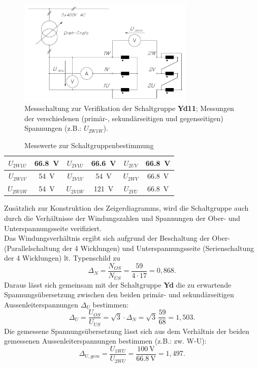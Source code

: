 \begin{figure}[h!]
    \centering
    \includegraphics[width=0.75\textwidth, angle =0]{3/images/Schaltgruppe_Messungen.pdf}
    \caption{Messschaltung zur Verifikation der Schaltgruppe \textbf{Yd11}; Messungen der verschiedenen (primär-, sekundärseitigen und gegenseitigen) Spannungen (z.B.: $U_{2W1W}$).}
    \label{fig:Schaltgruppe_Messschaltung}
\end{figure}
\begin{table}[h!]
    \centering
    \begin{tabular}{|c|c|c|c|c|c|}
    \hline
        $U_{2W1U}$ & \SI{66.8}{\volt} & $U_{2V1U}$ & \SI{66.6}{\volt} & $U_{2UV}$ & \SI{66.8}{\volt} \\ \hline
        $U_{2W1V}$ & \SI{54}{\volt} & $U_{2V1V}$ & \SI{54}{\volt} & $U_{2WV}$ & \SI{66.8}{\volt} \\ \hline
        $U_{2W1W}$ & \SI{54}{\volt} & $U_{2V1W}$ & \SI{121}{\volt} & $U_{2VU}$ & \SI{66.8}{\volt} \\ \hline
        
    \end{tabular}
    \caption{Messwerte zur Schaltgruppenbestimmung}
    \label{tab:Messwerte_Schaltgruppe}
\end{table}
Zusätzlich zur Konstruktion des Zeigerdiagramms, wird die Schaltgruppe auch durch die Verhältnisse der Windungszahlen und Spannungen der Ober- und Unterspannungsseite verifiziert.\\
Das Windungsverhältnis ergibt sich aufgrund der Beschaltung der Ober- (Parallelschaltung der 4 Wicklungen) und Unterspannungsseite (Serienschaltung der 4 Wicklungen) lt. Typenschild zu
\begin{equation}
    \Delta_N = \frac{N_{OS}}{N_{US}}=\frac{59}{4\cdot 17}=0,868.
\end{equation}
Daraus lässt sich gemeinsam mit der Schaltgruppe \textbf{Yd} die zu erwartende Spannungsübersetzung zwischen den beiden primär- und sekundärseitigen Aussenleiterspannungen $\Delta_U$ bestimmen:
\begin{equation}
    \Delta_U = \frac{U_{OS}}{U_{US}}=\sqrt{3}\cdot \Delta_N = \sqrt{3}\,\frac{59}{68}=1,503.
\end{equation}
Die gemessene Spannungsübersetzung lässt sich aus dem Verhältnis der beiden gemessenen Aussenleiterspannungen bestimmen (z.B.: zw. W-U):
\begin{equation}
    \Delta_{U,gem} = \frac{U_{1WU}}{U_{2WU}}=\frac{\SI{100}{\volt}}{\SI{66.8}{\volt}}=1,497.
\end{equation}


\clearpage
